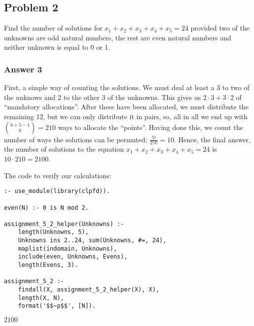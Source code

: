 \documentclass[11pt]{article}
\begin{document}
\subsection{Problem 2}
\label{sec:orgheadline5}
Find the number of solutions for \(x_1 + x_2 + x_3 + x_4 + x_5 = 24\)
provided two of the unknowns are odd natural numbers, the rest are even
natural numbers and neither unknown is equal to 0 or 1.

\subsubsection{Answer 3}
\label{sec:orgheadline4}
First, a simple way of counting the solutions.  We must deal at least a 3 to
two of the unknows and 2 to the other 3 of the unknowns.  This gives us \(2
    \cdot 3 + 3 \cdot 2\) of ``mandatory allocations''.  After these have been
allocated, we must distribute the remaining 12, but we can only distribute
it in pairs, so, all in all we end up with \({6 + 5 - 1 \choose 6} = 210\)
ways to allocate the ``points''.  Having done this, we count the number of
ways the solutions can be permuted: \(\frac{5!}{2!3!}=10\).  Hence, the final
answer, the number of solutions to the equation \(x_1 + x_2 + x_3 + x_4 + x_5
    = 24\) is \(10 \cdot 210 = 2100\).

The code to verify our calculations:
\lstset{language=prolog,label= ,caption= ,captionpos=b,numbers=none}
\begin{lstlisting}
:- use_module(library(clpfd)).

even(N) :- 0 is N mod 2.

assignment_5_2_helper(Unknowns) :-
    length(Unknowns, 5),
    Unknowns ins 2..24, sum(Unknowns, #=, 24),
    maplist(indomain, Unknowns),
    include(even, Unknowns, Evens),
    length(Evens, 3).

assignment_5_2 :-
    findall(X, assignment_5_2_helper(X), X),
    length(X, N),
    format('$$~p$$', [N]).
\end{lstlisting}

\(2100\)
\end{document}
